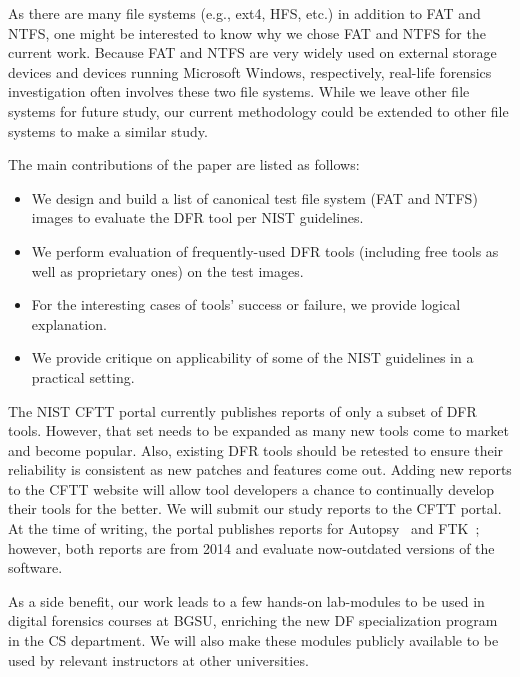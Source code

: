 As there are many file systems (e.g., ext4, HFS, etc.) in addition to FAT and NTFS, one might be interested to know why we chose FAT and NTFS for the current work. 
Because FAT and NTFS are very widely used on external storage devices and devices running Microsoft Windows, respectively,
real-life forensics investigation often involves these two file systems.
While we leave other file systems for future study, our current methodology could be 
extended to other file systems to make a similar study.

The main contributions of the paper are listed as follows:
\begin{itemize}
\item We design and build a list of canonical test file system (FAT and NTFS) images to evaluate the DFR tool per NIST guidelines. 
\item We perform evaluation of frequently-used DFR tools (including free tools as well as proprietary ones) on the test images.
\item For the interesting cases of tools' success or failure, we provide logical explanation.
\item We provide critique on applicability of some of the NIST guidelines in a practical setting. 
\end{itemize}


The NIST CFTT portal currently publishes reports of only a subset of DFR tools. 
However, that set needs to be expanded as many new tools come to market and become popular.
Also, existing DFR tools should be retested to ensure their reliability is consistent 
as new patches and features come out. 
Adding new reports to the CFTT website will allow tool developers a 
chance to continually develop their tools for the better. We will submit our study reports to the CFTT portal.
At the time of writing, the portal publishes reports for Autopsy~\cite{dhs:autopsy} and FTK~\cite{dhs:ftk}; 
however, both reports are from 2014 and evaluate now-outdated versions of the software.

As a side benefit, our work leads to a few hands-on lab-modules to be used in digital forensics courses 
at BGSU, enriching the new DF specialization program in the CS department. We will also make these modules
publicly available to be used by relevant instructors at other universities.
